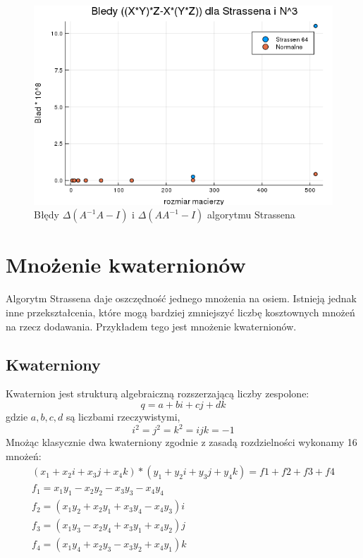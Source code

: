 \documentclass[paper=a4, fontsize=11pt]{scrartcl} %
\numberwithin{equation}{section} %
\numberwithin{figure}{section} %
\numberwithin{table}{section} %
\begin{document}
\begin{figure}[h!]
  \includegraphics[width=\linewidth]{BladXYZ.png}
  \caption{Błędy $\Delta(A^{-1}A - I)$ i $\Delta(A A^{-1} - I)$ algorytmu Strassena}
  \label{xyz}
\end{figure}


\FloatBarrier

\section{Mnożenie kwaternionów}
Algorytm Strassena daje oszczędność jednego mnożenia na osiem. Istnieją jednak inne przekształcenia,
które mogą bardziej zmniejszyć liczbę kosztownych mnożeń na rzecz dodawania. Przykładem tego jest mnożenie kwaternionów.

\subsection{Kwaterniony}
Kwaternion jest strukturą algebraiczną rozszerzającą liczby zespolone:
\[q = a + bi + cj + dk \]
gdzie ${a,b,c,d}$ są liczbami rzeczywistymi,
 \[i^{2}=j^{2}=k^{2}=ijk=-1 \]
Mnożąc klasycznie dwa kwaterniony zgodnie z zasadą rozdzielności wykonamy 16 mnożeń:\medbreak
\begin{equation}
	\begin{gathered}
	(x_1 + x_2 i + x_3 j + x_4 k ) * (y_1 + y_2 i + y_3 j + y_4 k) = f1 + f2 + f3 + f4 \\
	f_1 = x_1 y_1 - x_2 y_2 - x_3 y_3 - x_4 y_4 \\
	f_2 = (x_1 y_2 + x_2 y_1 + x_3 y_4 - x_4 y_3 ) i \\
	f_3 = ( x_1 y_3 - x_2 y_4 + x_3 y_1 + x_4 y_2 ) j \\
	f_4 = ( x_1 y_4 + x_2 y_3 - x_3 y_2 + x_4 y_1 ) k	
	\end{gathered}
\end{equation}
\end{document}
